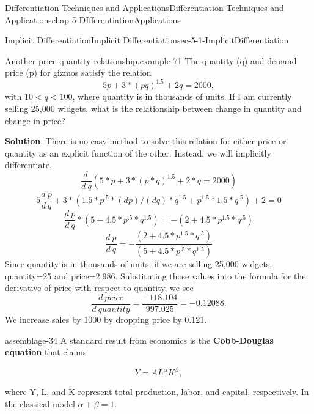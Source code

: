 \documentclass[oneside,10pt,]{book}
\newcommand{\terminology}[1]{\textbf{#1}}
\numberwithin{equation}{section}
\newcommand{\lt}{<}
\begin{document}
\begin{chapterptx}{Differentiation Techniques and Applications}{}{Differentiation Techniques and Applications}{}{}{chap-5-DIfferentiationApplications}
\begin{sectionptx}{Implicit Differentiation}{}{Implicit Differentiation}{}{}{sec-5-1-ImplicitDifferentiation}
\begin{example}{Another price-quantity relationship.}{example-71}%
\hypertarget{p-1878}{}%
The quantity (q) and demand price (p) for gizmos satisfy the relation%
%
\begin{equation*}
5p+3*(pq)^{1.5}+2q=2000,
\end{equation*}
\hypertarget{p-1879}{}%
with \(10\lt q\lt 100\), where quantity is in thousands of units.  If I am currently selling 25,000 widgets, what is the relationship between change in quantity and change in price?%
\par
\hypertarget{p-1880}{}%
\terminology{Solution}: There is no easy method to solve this relation for either price or quantity as an explicit function of the other.  Instead, we will implicitly differentiate.%
%
\begin{equation*}
\frac{d\ }{d\ q}(5*p+3*(p*q)^1.5+2*q=2000)
\end{equation*}
%
\begin{equation*}
5 \frac{d\ p}{d\ q}+3*(1.5*p^.5*(d p)/(d q)*q^{1.5}+p^{1.5}*1.5*q^{.5} )+2=0
\end{equation*}
%
\begin{equation*}
\frac{d\ p}{d\ q}*(5+4.5*p^{.5}*q^{1.5} )=-(2+4.5*p^{1.5}*q^{.5})
\end{equation*}
%
\begin{equation*}
\frac{d\ p}{d\ q}=-\frac{(2+4.5*p^{1.5}*q^{.5})}{(5+4.5*p^{.5}*q^{1.5} ) }
\end{equation*}
\hypertarget{p-1881}{}%
Since quantity is in thousands of units, if we are selling 25,000 widgets, quantity=25 and price=2.986.  Substituting those values into the formula for the derivative of price with respect to quantity, we see%
%
\begin{equation*}
\frac{d\ price}{d\ quantity}=\frac{-118.104}{997.025}=-0.12088.
\end{equation*}
\hypertarget{p-1882}{}%
We increase sales by 1000 by dropping price by \textdollar{}0.121.%
\end{example}
\begin{assemblage}{}{assemblage-34}%
\hypertarget{p-1883}{}%
A standard result from economics is the \terminology{Cobb-Douglas equation} that claims%
\par
\hypertarget{p-1884}{}%
%
\begin{equation*}
Y=AL^\alpha K^\beta,
\end{equation*}
%
\par
\hypertarget{p-1885}{}%
where Y, L, and K represent total production, labor, and capital, respectively.  In the classical model \(\alpha+\beta=1\).%

\end{assemblage}
\end{sectionptx}
\end{chapterptx}
\end{document}
